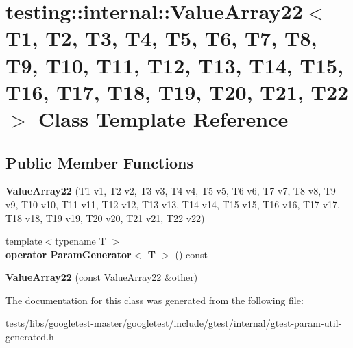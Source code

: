 \hypertarget{classtesting_1_1internal_1_1ValueArray22}{}\section{testing\+:\+:internal\+:\+:Value\+Array22$<$ T1, T2, T3, T4, T5, T6, T7, T8, T9, T10, T11, T12, T13, T14, T15, T16, T17, T18, T19, T20, T21, T22 $>$ Class Template Reference}
\label{classtesting_1_1internal_1_1ValueArray22}
\subsection*{Public Member Functions}
\begin{DoxyCompactItemize}
\item 
\mbox{\label{classtesting_1_1internal_1_1ValueArray22_a65c51cba30994847b9e904edb41dee0e}} 
{\bfseries Value\+Array22} (T1 v1, T2 v2, T3 v3, T4 v4, T5 v5, T6 v6, T7 v7, T8 v8, T9 v9, T10 v10, T11 v11, T12 v12, T13 v13, T14 v14, T15 v15, T16 v16, T17 v17, T18 v18, T19 v19, T20 v20, T21 v21, T22 v22)
\item 
\mbox{\label{classtesting_1_1internal_1_1ValueArray22_aed2e5437d46e87d6de846be6f27ea936}} 
{\footnotesize template$<$typename T $>$ }\\{\bfseries operator Param\+Generator$<$ T $>$} () const
\item 
\mbox{\label{classtesting_1_1internal_1_1ValueArray22_aa1224f9cebb6f87d7ad78ed90b42e77e}} 
{\bfseries Value\+Array22} (const \hyperlink{classtesting_1_1internal_1_1ValueArray22}{Value\+Array22} \&other)
\end{DoxyCompactItemize}


The documentation for this class was generated from the following file\+:\begin{DoxyCompactItemize}
\item 
tests/libs/googletest-\/master/googletest/include/gtest/internal/gtest-\/param-\/util-\/generated.\+h\end{DoxyCompactItemize}
